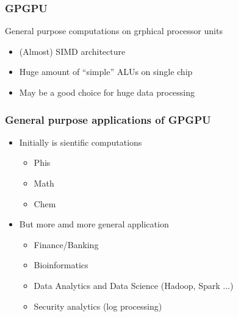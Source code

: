 \documentclass[xcolor=table]{beamer}
\begin{document}
\begin{frame}[fragile]
  \transwipe[direction=90]
  \frametitle{GPGPU}
  \begin{minipage}[m]{0.40\linewidth}
\end{minipage}\hfill
\begin{minipage}[m]{0.6\linewidth}
General purpose computations on grphical processor units
\begin{itemize}
      \item (Almost) SIMD architecture 
      \item Huge amount of ``simple'' ALUs on single chip
      \item May be a good choice for huge data processing
\end{itemize}

\end{minipage}

\end{frame}

\begin{frame}[fragile]
  \transwipe[direction=90]
  \frametitle{General purpose applications of GPGPU}
  \begin{itemize}
    \item Initially is sientific computations
    \begin{itemize}
      \item Phis
      \item Math
      \item Chem
    \end{itemize}
    \item But more amd more general application
      \begin{itemize} 
        \item Finance/Banking
        \item Bioinformatics
        \item Data Analytics and Data Science (Hadoop, Spark ...)
        \item Security analytics (log processing)
      \end{itemize}
  \end{itemize}
\end{frame}
\end{document}
